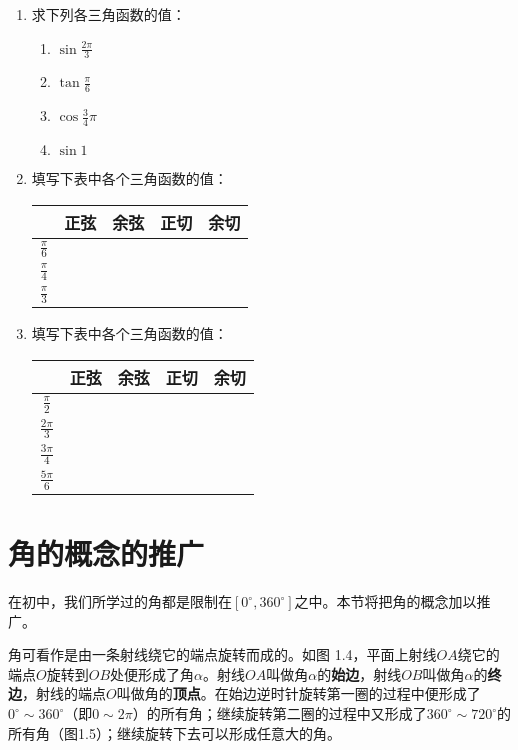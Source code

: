 \begin{enumerate}
\item 求下列各三角函数的值：
\begin{multicols}{4}
\begin{enumerate}[(1)]
    \item $\sin\frac{2\pi}{3}$
    \item $\tan\frac{\pi}{6}$
    \item $\cos\frac{3}{4}\pi$
    \item $\sin 1$
\end{enumerate}
\end{multicols}

\item 填写下表中各个三角函数的值：
\begin{center}
\begin{tabular}{c|cccc}
\hline
&  正弦  &  余弦  & 正切  & 余切\\
\hline
$\frac{\pi}{6}$ &\\ [1.5ex]
$\frac{\pi}{4}$ &\\ [1.5ex]
$\frac{\pi}{3}$ &\\  [1.5ex]
\hline
\end{tabular}
\end{center}


\item 填写下表中各个三角函数的值：
\begin{center}
    \begin{tabular}{c|cccc}
    \hline
    &  正弦  &  余弦  & 正切  & 余切\\
    \hline
    $\frac{\pi}{2}$ &\\[1.5ex]
    $\frac{2\pi}{3}$ &\\[1.5ex]
    $\frac{3\pi}{4}$ &\\[1.5ex]
    $\frac{5\pi}{6}$ &\\[1.5ex]
    \hline
    \end{tabular}
    \end{center}
\end{enumerate}

\section{角的概念的推广}
在初中，我们所学过的角都是限制在$[0^{\circ}, 360^{\circ}]$之中。本节将把角的概念加以推广。

角可看作是由一条射线绕它的端点旋转而成的。如图
1.4，平面上射线$OA$绕它的端点$O$旋转到$OB$处便形成了角$\alpha$。射线$OA$叫做角$\alpha$的\textbf{始边}，射线$OB$叫做角$\alpha$的\textbf{终边}，射线的端点$O$叫做角的\textbf{顶点}。在始边逆时针旋转第一圈的过程中便形成了$0^{\circ}\sim  360^{\circ}$（即$0\sim 2\pi$）的所有角；继续旋转第二圈的过程中又形成了$360^{\circ}\sim  720^{\circ}$的所有角（图1.5）；继续旋转下去可以形成任意大的角。

